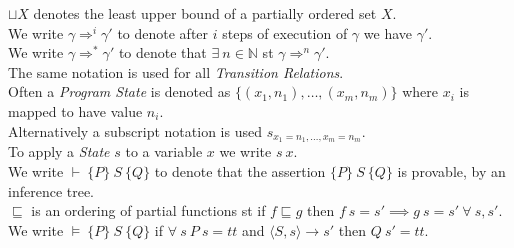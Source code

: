 \documentclass[11pt,a4paper]{article}
\begin{document}
$\sqcup X$ denotes the least upper bound of a partially ordered set $X$.\\

We write $\gamma\Rightarrow^i\gamma'$ to denote after $i$ steps of execution of $\gamma$ we have $\gamma'$.\\
We write $\gamma\Rightarrow^*\gamma'$ to denote that $\exists\ n\in\mathbb{N}$ st $\gamma\Rightarrow^n\gamma'$.\\
\NB The same notation is used for all \textit{Transition Relations}.\\

Often a \textit{Program State} is denoted as $\{(x_1,n_1),\dots,(x_m,n_m)\}$ where $x_i$ is mapped to have value $n_i$.\\
Alternatively a subscript notation is used $s_{x_1=n_1,\dots,x_m=n_m}$.\\
To apply a \textit{State} $s$ to a variable $x$ we write $s\ x$.\\

We write $\vdash\ \{P\}\ S\ \{Q\}$ to denote that the assertion $\{P\}\ S\ \{Q\}$ is provable, by an inference tree.\\

$\sqsubseteq$ is an ordering of partial functions st if $f\sqsubseteq g$ then $f\ s=s'\implies g\ s=s'\ \forall\ s,s'$.\\

We write $\vDash\ \{P\}\ S\ \{Q\}$ if $\forall\ s\ P\ s=tt$ and $\langle S,s\rangle\to s'$ then $Q\ s'=tt$.\\
\end{document}
